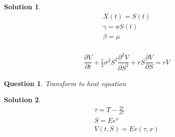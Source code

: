 \documentclass[16pt]{article}
\newtheorem{qu}{Question}[section]
\newtheorem{sol}{Solution}[section]
\begin{document}
\begin{sol}
		\begin{eqnarray*}
			X(t) = S(t)\\
			\gamma = \sigma S(t) \\
			\beta = \mu \\
		\end{eqnarray*}
	
		\begin{eqnarray*}
			\dfrac{\partial V}{\partial t} + \frac{1}{2} \sigma^2 S^2 \dfrac{\partial^2 V}{\partial S^2} + rS \dfrac{\partial V}{\partial S} = rV
		\end{eqnarray*}
	\end{sol}

	\begin{qu}
		Transform to heat equation
	\end{qu}
	\begin{sol}
		\begin{eqnarray*}
			\tau = T - \frac{2t}{\sigma^2} \\
			S = E e^{x} \\
			V(t,S) = E v(\tau, x)
		\end{eqnarray*}
	

\end{sol}
\end{document}
